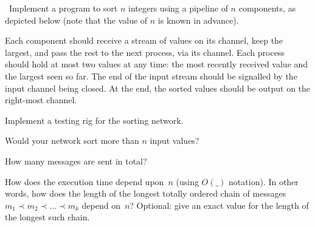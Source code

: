 \begin{question}
\Programming\ Implement a program to sort $n$ integers using a pipeline of $n$
components, as depicted below (note that the value of $n$ is known in
advance).
%
\begin{center}
\end{center}
%
Each component
should receive a stream of values on its  channel, keep the
largest, and pass the rest to the next process, via its  channel.
Each process should hold at most two values at any time: the most recently
received value and the largest seen so far.  The end of the input stream
should be signalled by the input channel being closed.  At the end, the sorted
values should be output on the right-most channel.

Implement a testing rig for the sorting network.

Would your network sort more than $n$ input values?

How many messages are sent in total?

How does the execution time depend upon~$n$ (using $O(\_)$ notation).  In
other words, how does the length of the longest totally ordered chain of
messages \( m_1 \prec m_2 \prec \ldots \prec m_k \) depend on~$n$?  Optional:
give an exact value for the length of the longest such chain.
\end{question}


